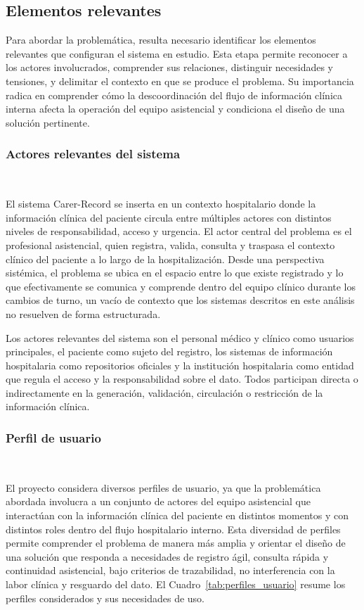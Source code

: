 
\subsection{Elementos relevantes}

Para abordar la problemática, resulta necesario identificar los elementos relevantes que configuran el sistema en estudio. Esta etapa permite reconocer a los actores involucrados, comprender sus relaciones, distinguir necesidades y tensiones, y delimitar el contexto en que se produce el problema. Su importancia radica en comprender cómo la descoordinación del flujo de información clínica interna afecta la operación del equipo asistencial y condiciona el diseño de una solución pertinente.\\

\subsubsection*{Actores relevantes del sistema} ~

El sistema Carer-Record se inserta en un contexto hospitalario donde la información clínica del paciente circula entre múltiples actores con distintos niveles de responsabilidad, acceso y urgencia. El actor central del problema es el profesional asistencial, quien registra, valida, consulta y traspasa el contexto clínico del paciente a lo largo de la hospitalización. Desde una perspectiva sistémica, el problema se ubica en el espacio entre lo que existe registrado y lo que efectivamente se comunica y comprende dentro del equipo clínico durante los cambios de turno, un vacío de contexto que los sistemas descritos en este análisis no resuelven de forma estructurada.

Los actores relevantes del sistema son el personal médico y clínico como usuarios principales, el paciente como sujeto del registro, los sistemas de información hospitalaria como repositorios oficiales y la institución hospitalaria como entidad que regula el acceso y la responsabilidad sobre el dato. Todos participan directa o indirectamente en la generación, validación, circulación o restricción de la información clínica.\\

\subsubsection*{Perfil de usuario} ~

El proyecto considera diversos perfiles de usuario, ya que la problemática abordada involucra a un conjunto de actores del equipo asistencial que interactúan con la información clínica del paciente en distintos momentos y con distintos roles dentro del flujo hospitalario interno. Esta diversidad de perfiles permite comprender el problema de manera más amplia y orientar el diseño de una solución que responda a necesidades de registro ágil, consulta rápida y continuidad asistencial, bajo criterios de trazabilidad, no interferencia con la labor clínica y resguardo del dato. El Cuadro~\ref{tab:perfiles_usuario} resume los perfiles considerados y sus necesidades de uso.

